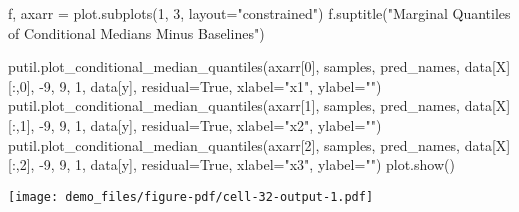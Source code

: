 \documentclass[
  letterpaper,
  DIV=11,
  numbers=noendperiod]{scrartcl}
\newenvironment{Shaded}{\begin{snugshade}}{\end{snugshade}}
\newcommand{\DecValTok}[1]{\textcolor[rgb]{0.68,0.00,0.00}{#1}}
\newcommand{\NormalTok}[1]{\textcolor[rgb]{0.00,0.23,0.31}{#1}}
\newcommand{\OperatorTok}[1]{\textcolor[rgb]{0.37,0.37,0.37}{#1}}
\newcommand{\StringTok}[1]{\textcolor[rgb]{0.13,0.47,0.30}{#1}}
\newcommand{\VariableTok}[1]{\textcolor[rgb]{0.07,0.07,0.07}{#1}}
\begin{document}
\begin{Shaded}
\begin{Highlighting}[]
\NormalTok{f, axarr }\OperatorTok{=}\NormalTok{ plot.subplots(}\DecValTok{1}\NormalTok{, }\DecValTok{3}\NormalTok{, layout}\OperatorTok{=}\StringTok{"constrained"}\NormalTok{)}
\NormalTok{f.suptitle(}\StringTok{"Marginal Quantiles of Conditional Medians Minus Baselines"}\NormalTok{)}

\NormalTok{putil.plot\_conditional\_median\_quantiles(axarr[}\DecValTok{0}\NormalTok{], samples, pred\_names,}
\NormalTok{                                        data[}\StringTok{\textquotesingle{}X\textquotesingle{}}\NormalTok{][:,}\DecValTok{0}\NormalTok{], }\OperatorTok{{-}}\DecValTok{9}\NormalTok{, }\DecValTok{9}\NormalTok{, }\DecValTok{1}\NormalTok{,}
\NormalTok{                                        data[}\StringTok{\textquotesingle{}y\textquotesingle{}}\NormalTok{], residual}\OperatorTok{=}\VariableTok{True}\NormalTok{,}
\NormalTok{                                        xlabel}\OperatorTok{=}\StringTok{"x1"}\NormalTok{, ylabel}\OperatorTok{=}\StringTok{""}\NormalTok{)}
\NormalTok{putil.plot\_conditional\_median\_quantiles(axarr[}\DecValTok{1}\NormalTok{], samples, pred\_names,}
\NormalTok{                                        data[}\StringTok{\textquotesingle{}X\textquotesingle{}}\NormalTok{][:,}\DecValTok{1}\NormalTok{], }\OperatorTok{{-}}\DecValTok{9}\NormalTok{, }\DecValTok{9}\NormalTok{, }\DecValTok{1}\NormalTok{,}
\NormalTok{                                        data[}\StringTok{\textquotesingle{}y\textquotesingle{}}\NormalTok{], residual}\OperatorTok{=}\VariableTok{True}\NormalTok{,}
\NormalTok{                                        xlabel}\OperatorTok{=}\StringTok{"x2"}\NormalTok{, ylabel}\OperatorTok{=}\StringTok{""}\NormalTok{)}
\NormalTok{putil.plot\_conditional\_median\_quantiles(axarr[}\DecValTok{2}\NormalTok{], samples, pred\_names,}
\NormalTok{                                        data[}\StringTok{\textquotesingle{}X\textquotesingle{}}\NormalTok{][:,}\DecValTok{2}\NormalTok{], }\OperatorTok{{-}}\DecValTok{9}\NormalTok{, }\DecValTok{9}\NormalTok{, }\DecValTok{1}\NormalTok{,}
\NormalTok{                                        data[}\StringTok{\textquotesingle{}y\textquotesingle{}}\NormalTok{], residual}\OperatorTok{=}\VariableTok{True}\NormalTok{,}
\NormalTok{                                        xlabel}\OperatorTok{=}\StringTok{"x3"}\NormalTok{, ylabel}\OperatorTok{=}\StringTok{""}\NormalTok{)}
\NormalTok{plot.show()}
\end{Highlighting}
\end{Shaded}

\texttt{[image: demo\_files/figure-pdf/cell-32-output-1.pdf]}
\end{document}
